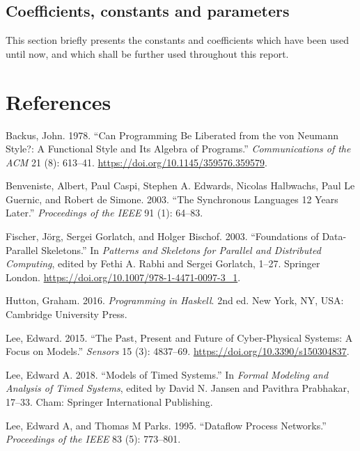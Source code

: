 \documentclass[
  a4paper,
]{article}
\begin{document}
\hypertarget{sec:consts-coefs-atom}{%
\subsection{Coefficients, constants and
parameters}\label{sec:consts-coefs-atom}}

This section briefly presents the constants and coefficients which have
been used until now, and which shall be further used throughout this
report.

\hypertarget{references}{%
\section*{References}\label{references}}

\hypertarget{refs}{}
\leavevmode\hypertarget{ref-backus-1978}{}%
Backus, John. 1978. ``Can Programming Be Liberated from the von Neumann
Style?: A Functional Style and Its Algebra of Programs.''
\emph{Communications of the ACM} 21 (8): 613--41.
\url{https://doi.org/10.1145/359576.359579}.

\leavevmode\hypertarget{ref-Benveniste03}{}%
Benveniste, Albert, Paul Caspi, Stephen A. Edwards, Nicolas Halbwachs,
Paul Le Guernic, and Robert de Simone. 2003. ``The Synchronous Languages
12 Years Later.'' \emph{Proceedings of the IEEE} 91 (1): 64--83.

\leavevmode\hypertarget{ref-Fischer-2003}{}%
Fischer, Jörg, Sergei Gorlatch, and Holger Bischof. 2003. ``Foundations
of Data-Parallel Skeletons.'' In \emph{Patterns and Skeletons for
Parallel and Distributed Computing}, edited by Fethi A. Rabhi and Sergei
Gorlatch, 1--27. Springer London.
\url{https://doi.org/10.1007/978-1-4471-0097-3_1}.

\leavevmode\hypertarget{ref-hutton-2016}{}%
Hutton, Graham. 2016. \emph{Programming in Haskell}. 2nd ed. New York,
NY, USA: Cambridge University Press.

\leavevmode\hypertarget{ref-lee-2015}{}%
Lee, Edward. 2015. ``The Past, Present and Future of Cyber-Physical
Systems: A Focus on Models.'' \emph{Sensors} 15 (3): 4837--69.
\url{https://doi.org/10.3390/s150304837}.

\leavevmode\hypertarget{ref-Lee18}{}%
Lee, Edward A. 2018. ``Models of Timed Systems.'' In \emph{Formal
Modeling and Analysis of Timed Systems}, edited by David N. Jansen and
Pavithra Prabhakar, 17--33. Cham: Springer International Publishing.

\leavevmode\hypertarget{ref-lee95}{}%
Lee, Edward A, and Thomas M Parks. 1995. ``Dataflow Process Networks.''
\emph{Proceedings of the IEEE} 83 (5): 773--801.
\end{document}

